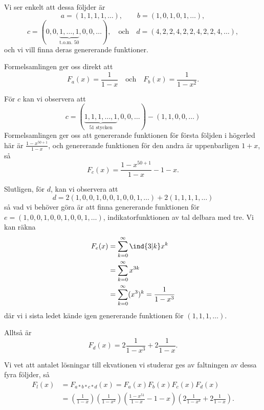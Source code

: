 \documentclass[nobib]{tufte-handout}
\begin{document}
Vi ser enkelt att dessa följder är
$$a = (1,1,1,1,\ldots),\qquad b = (1,0,1,0,1,\ldots),$$
$$c = (0,0,\underbrace{1,\ldots,1}_{\text{t.o.m. }50},0,0,\ldots), \quad\text{och}\quad d = (4,2,2,4,2,2,4,2,2,4,\ldots),$$
och vi vill finna deras genererande funktioner.

Formelsamlingen ger oss direkt att
$$F_a(x) = \frac{1}{1-x}\quad\text{och}\quad F_b(x) = \frac{1}{1 - x^2}.$$

För $c$ kan vi observera att 
$$c = (\underbrace{1,1,1,\ldots,1}_{51\text{ stycken}},0,0,\ldots) - (1,1,0,0,\ldots)$$
Formelsamlingen ger oss att genererande funktionen för första följden i högerled här är $\frac{1 - x^{50+1}}{1-x}$, och genererande funktionen för den andra är uppenbarligen $1 + x$, så
$$F_c(x) = \frac{1 - x^{50+1}}{1-x} - 1 - x.$$

Slutligen, för $d$, kan vi observera att
$$d = 2(1,0,0,1,0,0,1,0,0,1,\ldots) + 2(1,1,1,1,\ldots)$$
så vad vi behöver göra är att finna genererande funktionen för $e = (1,0,0,1,0,0,1,0,0,1,\ldots)$, indikatorfunktionen av tal delbara med tre. Vi kan räkna
\begin{align*}
  F_{e}(x) &= \sum_{k=0}^{\infty} \ind{3|k} x^k\\
  &= \sum_{k=0}^{\infty} x^{3k}\\
  &= \sum_{k=0}^{\infty} (x^3)^k = \frac{1}{1-x^3}
\end{align*}
där vi i sista ledet kände igen genererande funktionen för $(1,1,1,\ldots)$.

Alltså är
$$F_d(x) = 2\frac{1}{1 - x^3} + 2\frac{1}{1 - x}.$$

Vi vet att antalet lösningar till ekvationen vi studerar ges av faltningen av dessa fyra följder, så
\begin{align*}
  F_l(x) &= F_{a * b * c * d}(x) = F_a(x)F_b(x)F_c(x)F_d(x)\\
  &= \left(\frac{1}{1-x}\right)\left(\frac{1}{1-x^2}\right)\left(\frac{1 - x^{51}}{1-x} - 1 - x\right)\left(2\frac{1}{1 - x^3} + 2\frac{1}{1 - x}\right).
\end{align*}

%
%
\end{document}
